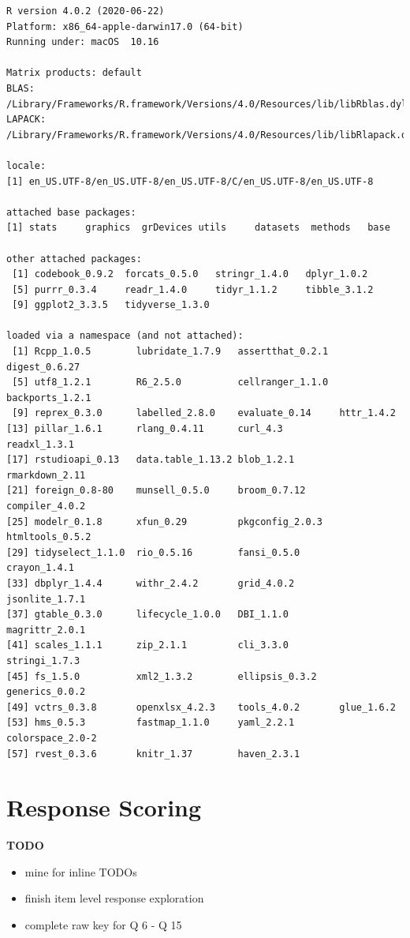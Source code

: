 \documentclass[
  letterpaper,
  DIV=11,
  numbers=noendperiod]{scrreprt}
\providecommand{\tightlist}{%
  \setlength{\itemsep}{0pt}\setlength{\parskip}{0pt}}\usepackage{longtable,booktabs,array}
\begin{document}
\begin{verbatim}
R version 4.0.2 (2020-06-22)
Platform: x86_64-apple-darwin17.0 (64-bit)
Running under: macOS  10.16

Matrix products: default
BLAS:   /Library/Frameworks/R.framework/Versions/4.0/Resources/lib/libRblas.dylib
LAPACK: /Library/Frameworks/R.framework/Versions/4.0/Resources/lib/libRlapack.dylib

locale:
[1] en_US.UTF-8/en_US.UTF-8/en_US.UTF-8/C/en_US.UTF-8/en_US.UTF-8

attached base packages:
[1] stats     graphics  grDevices utils     datasets  methods   base     

other attached packages:
 [1] codebook_0.9.2  forcats_0.5.0   stringr_1.4.0   dplyr_1.0.2    
 [5] purrr_0.3.4     readr_1.4.0     tidyr_1.1.2     tibble_3.1.2   
 [9] ggplot2_3.3.5   tidyverse_1.3.0

loaded via a namespace (and not attached):
 [1] Rcpp_1.0.5        lubridate_1.7.9   assertthat_0.2.1  digest_0.6.27    
 [5] utf8_1.2.1        R6_2.5.0          cellranger_1.1.0  backports_1.2.1  
 [9] reprex_0.3.0      labelled_2.8.0    evaluate_0.14     httr_1.4.2       
[13] pillar_1.6.1      rlang_0.4.11      curl_4.3          readxl_1.3.1     
[17] rstudioapi_0.13   data.table_1.13.2 blob_1.2.1        rmarkdown_2.11   
[21] foreign_0.8-80    munsell_0.5.0     broom_0.7.12      compiler_4.0.2   
[25] modelr_0.1.8      xfun_0.29         pkgconfig_2.0.3   htmltools_0.5.2  
[29] tidyselect_1.1.0  rio_0.5.16        fansi_0.5.0       crayon_1.4.1     
[33] dbplyr_1.4.4      withr_2.4.2       grid_4.0.2        jsonlite_1.7.1   
[37] gtable_0.3.0      lifecycle_1.0.0   DBI_1.1.0         magrittr_2.0.1   
[41] scales_1.1.1      zip_2.1.1         cli_3.3.0         stringi_1.7.3    
[45] fs_1.5.0          xml2_1.3.2        ellipsis_0.3.2    generics_0.0.2   
[49] vctrs_0.3.8       openxlsx_4.2.3    tools_4.0.2       glue_1.6.2       
[53] hms_0.5.3         fastmap_1.1.0     yaml_2.2.1        colorspace_2.0-2 
[57] rvest_0.3.6       knitr_1.37        haven_2.3.1      
\end{verbatim}

\newpage

\hypertarget{sec-SGC3A-scoring}{%
\chapter{Response Scoring}\label{sec-SGC3A-scoring}}

\textbf{TODO}

\begin{itemize}
\tightlist
\item
  mine for inline TODOs
\item
  finish item level response exploration
\item
  complete raw key for Q 6 - Q 15
\end{itemize}
\end{document}
